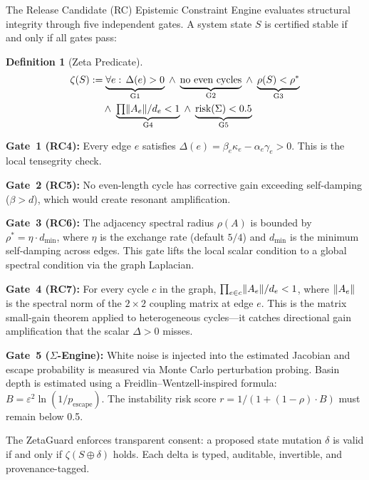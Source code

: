 \documentclass[10pt,twocolumn]{article}
\theoremstyle{definition}
\newtheorem{definition}[theorem]{Definition}
\theoremstyle{remark}
\DeclarePairedDelimiter{\norm}{\lVert}{\rVert}
\begin{document}
The Release Candidate (RC) Epistemic Constraint Engine evaluates structural integrity through five independent gates.  A system state $S$ is certified stable if and only if all gates pass:

\begin{definition}[Zeta Predicate]
{\small
\begin{align}
\zeta(S) &:= \underbrace{\forall e:\, \Delta(e)>0}_{\text{G1}} \;\wedge\; \underbrace{\text{no even cycles}}_{\text{G2}} \;\wedge\; \underbrace{\rho(S)<\rho^*}_{\text{G3}} \notag\\
&\quad\;\wedge\; \underbrace{\textstyle\prod \norm{A_e}/d_e < 1}_{\text{G4}} \;\wedge\; \underbrace{\text{risk}(\Sigma)<0.5}_{\text{G5}}
\end{align}
}
\end{definition}

\textbf{Gate~1 (RC4):} Every edge $e$ satisfies $\Delta(e) = \beta_e\kappa_e - \alpha_e\gamma_e > 0$.  This is the local tensegrity check.

\textbf{Gate~2 (RC5):} No even-length cycle has corrective gain exceeding self-damping ($\beta > d$), which would create resonant amplification.

\textbf{Gate~3 (RC6):} The adjacency spectral radius $\rho(A)$ is bounded by $\rho^* = \eta \cdot d_{\min}$, where $\eta$ is the exchange rate (default $5/4$) and $d_{\min}$ is the minimum self-damping across edges.  This gate lifts the local scalar condition to a global spectral condition via the graph Laplacian.

\textbf{Gate~4 (RC7):} For every cycle $c$ in the graph, $\prod_{e \in c} \norm{A_e}/d_e < 1$, where $\norm{A_e}$ is the spectral norm of the $2 \times 2$ coupling matrix at edge $e$.  This is the matrix small-gain theorem applied to heterogeneous cycles---it catches directional gain amplification that the scalar $\Delta > 0$ misses.

\textbf{Gate~5 ($\Sigma$-Engine):} White noise is injected into the estimated Jacobian and escape probability is measured via Monte Carlo perturbation probing.  Basin depth is estimated using a Freidlin--Wentzell-inspired formula: $B = \varepsilon^2 \ln(1/p_{\mathrm{escape}})$.  The instability risk score $r = 1/(1 + (1-\rho) \cdot B)$ must remain below 0.5.

The ZetaGuard enforces transparent consent: a proposed state mutation $\delta$ is valid if and only if $\zeta(S \oplus \delta)$ holds.  Each delta is typed, auditable, invertible, and provenance-tagged.
\end{document}
